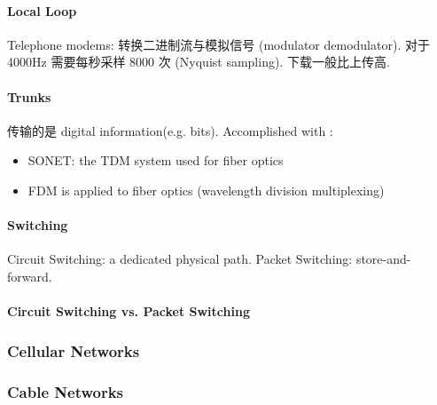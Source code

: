 \paragraph{Local Loop} Telephone modems: 转换二进制流与模拟信号 (modulator demodulator). 对于 4000Hz 需要每秒采样 8000 次 (Nyquist sampling). 下载一般比上传高. 


\paragraph{Trunks}传输的是 digital information(e.g. bits). Accomplished with :
\begin{itemize}\small
    \item SONET: the TDM system used for fiber optics
    \item FDM is applied to fiber optics (wavelength division multiplexing)
\end{itemize}

\paragraph{Switching} Circuit Switching: a dedicated physical path. Packet Switching: store-and-forward. 


\paragraph{Circuit Switching vs. Packet Switching}

\subsubsection{Cellular Networks}


\subsubsection{Cable Networks}